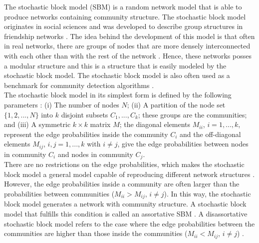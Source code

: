 \documentclass[11 pt , letterpaper , twoside , openright]{book}
\begin{document}
The stochastic block model (SBM) is a random network model that is able to produce networks containing community structure. The stochastic block model originates in social sciences and was developed to describe group structures in friendship networks \cite{Funke2019}. The idea behind the development of this model is that often in real networks, there are groups of nodes that are more densely interconnected with each other than with the rest of the network \cite{F.Costa2007}. Hence, these networks posses a modular structure and this is a structure that is easily modeled by the stochastic block model. The stochastic block model is also often used as a benchmark for community detection algorithms \cite{Abbe2018}.\\
\newline
The stochastic block model in its simplest form is defined by the following parameters \cite{Clauset2017}: (i) The number of nodes $N$; (ii) A partition of the node set $\{1, 2, ..., N\}$ into $k$ disjoint subsets $C_1, ..., C_k$; these groups are the communities; and (iii) A symmetric $k\times k$ matrix $M$; the diagonal elements $M_{ii}$, $i = 1, ..., k$, represent the edge probabilities inside the community $C_i$ and the off-diagonal elements $M_{ij}$, $i, j = 1, ..., k$ with $i \neq j$, give the edge probabilities between nodes in community $C_i$ and nodes in community $C_j$.\\
\newline
There are no restrictions on the edge probabilities, which makes the stochastic block model a general model capable of reproducing different network structures \cite{Karrer2011}. However, the edge probabilities inside a community are often larger than the probabilities between communities ($M_{ii} > M_{ij}$, $i \neq j$). In this way, the stochastic block model generates a network with community structure. A stochastic block model that fulfills this condition is called an assortative SBM \cite{Lee2019}. A disassortative stochastic block model refers to the case where the edge probabilities between the communities are higher than those inside the communities ($M_{ii} < M_{ij}$, $i \neq j$) \cite{Gribel2020}.\\
\newline
\end{document}
